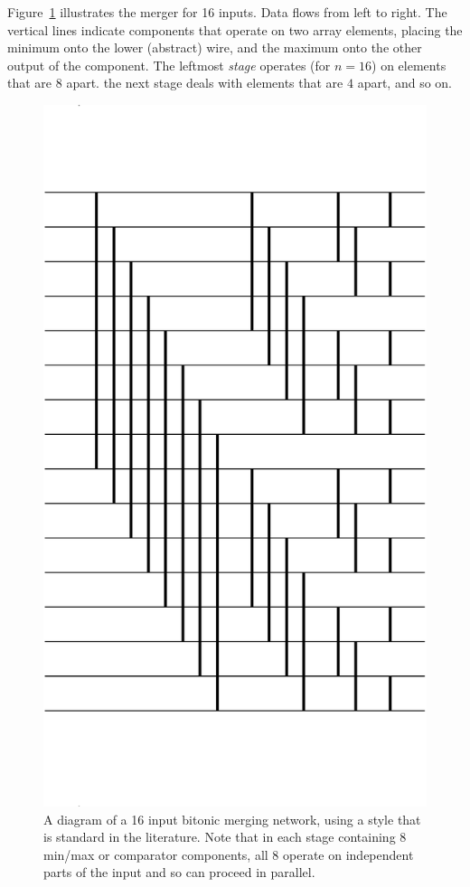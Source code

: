 Figure~\ref{fig:bitonicMerger} illustrates the merger for 16 inputs.
Data flows from left to right.
The vertical lines indicate components that operate on two array elements, placing the minimum onto the lower (abstract) wire, and the maximum onto the other output
of the component.
The leftmost {\em stage} operates (for $n=16$) on elements that are 
$8$ apart. the next stage deals with elements that are $4$ apart, and so on.

\begin{figure}
\centering
\includegraphics[scale=0.25]{./expressive/bitonic}
\caption{A diagram of a 16 input bitonic merging network, using
a style that is standard in the literature. Note
that in each stage containing 8 min/max or comparator components, all
8 operate on independent parts of the input and so can proceed in parallel.
}
\label{fig:bitonicMerger}
\end{figure}

